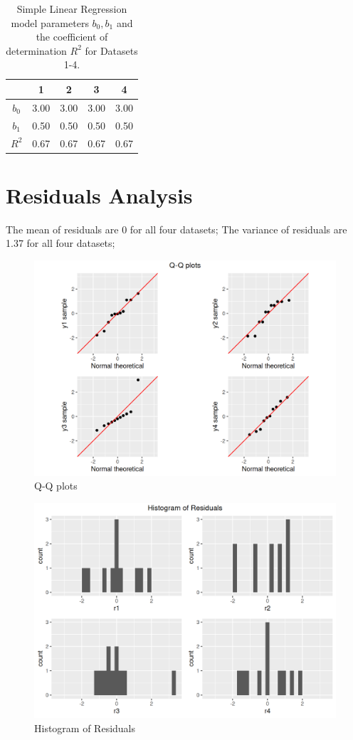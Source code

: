 \documentclass[12pt]{article}
\begin{document}
	\begin{table}[htpb]
		\centering
		\begin{tabular}{|c|c|c|c|c|}
			\hline
			 & 1 & 2 & 3 & 4  \\
			\hline
			$b_0$ & 3.00 & 3.00 & 3.00 & 3.00  \\
			\hline
			$b_1$ & 0.50 & 0.50 & 0.50 & 0.50  \\
			\hline
			$R^2$ & 0.67 & 0.67 & 0.67 & 0.67  \\
			\hline

		\end{tabular}
		\caption{Simple Linear Regression model parameters $b_0, b_1$ and the coefficient of determination $R^2$ for Datasets 1-4.}
		\label{tab:1}
	\end{table}



	
	\section{Residuals Analysis}
	
	The mean of residuals are 0 for all four datasets; 
	The variance of residuals are 1.37 for all four datasets; 
		



\begin{figure}[htbp]
\includegraphics[width=.7\textwidth]{QQplot.png}
\centering
\caption{Q-Q plots}
\label{Fig:qqplot}
\end{figure}

\begin{figure}[htbp]
\includegraphics[width=.7\textwidth]{histogram.png}
\centering
\caption{Histogram of Residuals}
\label{Fig:histogram}
\end{figure}
\end{document}
